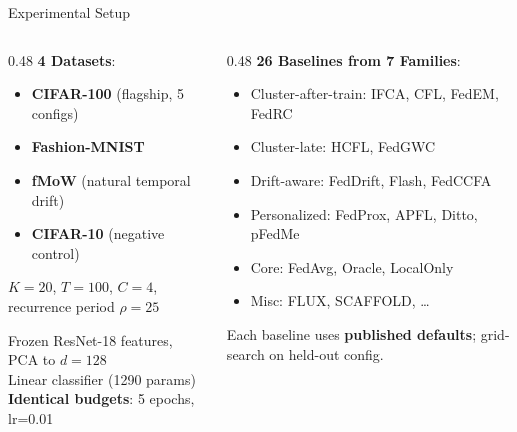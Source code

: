 \documentclass[aspectratio=169,11pt]{beamer}
\begin{document}
\begin{frame}{Experimental Setup}

\begin{columns}[T]
\begin{column}{0.48\textwidth}
\textbf{4 Datasets}:
\begin{itemize}
  \item \textbf{CIFAR-100} (flagship, 5 configs)
  \item \textbf{Fashion-MNIST}
  \item \textbf{fMoW} (natural temporal drift)
  \item \textbf{CIFAR-10} (negative control)
\end{itemize}

\vspace{6pt}
$K{=}20$, $T{=}100$, $C{=}4$, recurrence period $\rho{=}25$

\vspace{4pt}
Frozen ResNet-18 features, PCA to $d{=}128$\\
Linear classifier (1290 params)\\
\textbf{Identical budgets}: 5 epochs, lr=0.01
\end{column}

\begin{column}{0.48\textwidth}
\textbf{26 Baselines from 7 Families}:
\begin{itemize}
  \item \textcolor{cA}{Cluster-after-train}: IFCA, CFL, FedEM, FedRC
  \item Cluster-late: HCFL, FedGWC
  \item Drift-aware: FedDrift, Flash, FedCCFA
  \item Personalized: FedProx, APFL, Ditto, pFedMe
  \item Core: FedAvg, Oracle, LocalOnly
  \item Misc: FLUX, SCAFFOLD, \ldots
\end{itemize}

\vspace{6pt}
Each baseline uses \textbf{published defaults}; grid-search on held-out config.
\end{column}
\end{columns}
\end{frame}
\end{document}
